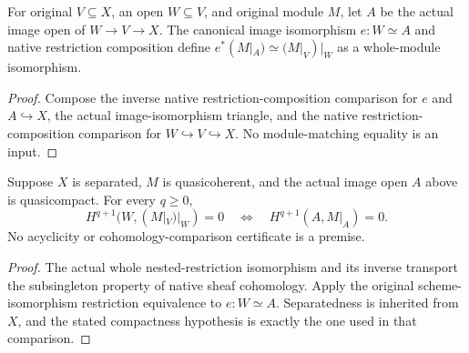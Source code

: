 \begin{definition}
\label{def:proj-affine-nested-restriction}
\leanok
For original $V\subseteq X$, an open $W\subseteq V$, and original
module $M$, let $A$ be the actual image open of $W\to V\to X$.
The canonical image isomorphism $e:W\simeq A$ and native restriction
composition define
$e^*(M|_A)\simeq(M|_V)|_W$ as a whole-module isomorphism.
\end{definition}
\begin{proof}
Compose the inverse native restriction-composition comparison for
$e$ and $A\hookrightarrow X$, the actual image-isomorphism triangle,
and the native restriction-composition comparison for
$W\hookrightarrow V\hookrightarrow X$.
No module-matching equality is an input.
\end{proof}

\begin{lemma}
\label{lem:proj-affine-nested-higher-zero}
\leanok
Suppose $X$ is separated, $M$ is quasicoherent, and the actual image
open $A$ above is quasicompact. For every $q\geq0$,
\[
 H^{q+1}(W,(M|_V)|_W)=0
 \quad\Longleftrightarrow\quad H^{q+1}(A,M|_A)=0.
\]
No acyclicity or cohomology-comparison certificate is a premise.
\end{lemma}
\begin{proof}
The actual whole nested-restriction isomorphism and its inverse
transport the subsingleton property of native sheaf cohomology.
Apply the original scheme-isomorphism restriction equivalence to
$e:W\simeq A$. Separatedness is inherited from $X$, and the stated
compactness hypothesis is exactly the one used in that comparison.
\end{proof}

